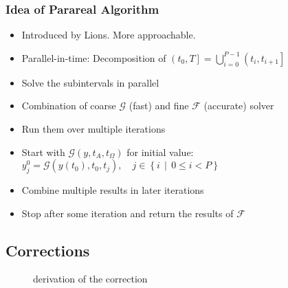 \begin{frame}
    \frametitle{Idea of Parareal Algorithm}
    \begin{itemize}[<+->]
        \item Introduced by Lions. More approachable.
        \item Parallel-in-time: Decomposition of \(\left(t_0, T\right] = \bigcup_{i=0}^{P-1} \left(t_i, t_{i+1}\right]\)
        \item Solve the subintervals in parallel
        \item Combination of coarse \(\mathcal{G}\) (fast) and fine \(\mathcal{F}\) (accurate) solver
        \item Run them over multiple iterations
        \item Start with \(\mathcal{G}\!\left(y, t_{A}, t_{\Omega}\right)\) for initial value:\\\(y_{j}^{0} = \mathcal{G}\!\left(y(t_0), t_0, t_{j}\right), \quad j \in \left\{i \,\middle|\, 0 \leq i < P\right\}\)
        \begin{scriptsize}
        \end{scriptsize}
        \item Combine multiple results in later iterations
        \item Stop after some iteration and return the results of \(\mathcal{F}\)
    \end{itemize}
    \end{frame}

\subsection{Corrections}

\begin{frame}
\begin{figure}[ht]
    \centering
        \begin{tikzpicture}[scale=1.7]
            
        \end{tikzpicture}
    \caption{derivation of the correction}
    \label{fig:merge}
\end{figure}
\end{frame}

